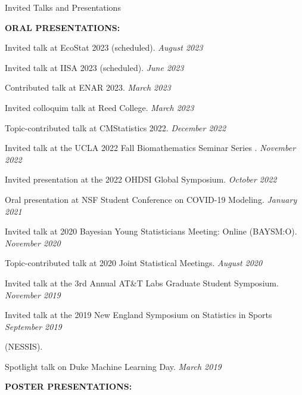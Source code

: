 \documentclass{resume} %
\begin{document}
\begin{rSection}{Invited Talks and Presentations}

\textbf{ORAL PRESENTATIONS:}

Invited talk at EcoStat 2023 (scheduled). \hfill {\em August 2023}

Invited talk at IISA 2023 (scheduled).  \hfill {\em June 2023}

%

Contributed talk at ENAR 2023. \hfill {\em March 2023}

Invited colloquim talk at Reed College. \hfill {\em March 2023}

Topic-contributed talk at CMStatistics 2022. \hfill {\em December 2022}

Invited talk at the UCLA 2022 Fall Biomathematics Seminar Series . \hfill {\em November 2022}

Invited presentation at the 2022 OHDSI Global Symposium.  \hfill {\em October 2022}

{Oral presentation at NSF Student Conference on COVID-19 Modeling.} \hfill {\em January 2021}

{Invited talk at 2020 Bayesian Young Statisticians Meeting: Online (BAYSM:O).} \hfill {\em November 2020}

{Topic-contributed talk at 2020 Joint Statistical Meetings. } \hfill {\em August 2020}

{Invited talk at the 3rd Annual AT\&T Labs Graduate Student Symposium.} \hfill {\em November 2019}


{Invited talk at the 2019 New England Symposium on Statistics in Sports} \hfill {\em September 2019}

\vspace{-0.1in}
 (NESSIS).
 
Spotlight talk on Duke Machine Learning Day. \hfill {\em March 2019}




\medskip
\textbf{POSTER PRESENTATIONS:}


\end{rSection}
\end{document}
